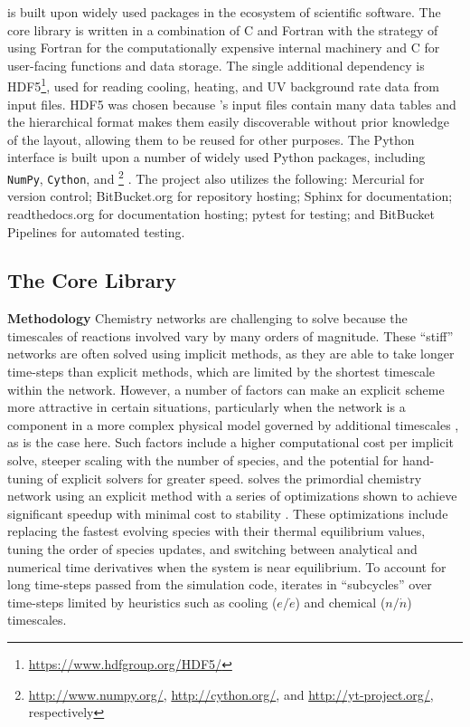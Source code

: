 \grackle{} is built upon widely used packages in the ecosystem of
scientific software.
The core
library is written in a combination of C and Fortran with the strategy
of using Fortran for the computationally expensive internal machinery
and C for user-facing functions and data storage.  The single
additional dependency is
HDF5\footnote{\url{https://www.hdfgroup.org/HDF5/}}, used for reading
cooling, heating,
and UV background rate data from input files.  HDF5 was chosen because
\grackle{}'s input files contain many data tables and the hierarchical
format makes them easily discoverable without prior knowledge of the
layout, allowing them to be reused for other purposes.  The Python
interface is built upon a number of widely used Python packages, including
\texttt{NumPy}, \texttt{Cython}, and
\yt{}\footnote{\url{http://www.numpy.org/}, \url{http://cython.org/},
  and \url{http://yt-project.org/}, respectively} \citep[][an SI2-funded
project]{2011ApJS..192....9T}.  The project also utilizes the following:
Mercurial for version control; BitBucket.org for repository hosting;
Sphinx for documentation; readthedocs.org for documentation
hosting; pytest for testing; and BitBucket Pipelines for automated testing.

\subsection{The Core Library}
\label{sec:core-library}

\noindent
{\bf Methodology}
Chemistry networks are challenging to solve because the timescales of
reactions involved vary by many orders of magnitude.  These ``stiff''
networks are often solved using implicit methods, as they are able to
take longer time-steps than explicit methods, which are limited by the
shortest timescale within the network.  However, a number of factors
can make an explicit scheme more attractive in certain situations,
particularly when the network is a component in a more complex physical
model governed by additional timescales \citep{2012JCoPh.231.5266G},
as is the case here.  Such factors include a higher
computational cost per implicit solve, steeper scaling
with the number of species, and the potential for hand-tuning of
explicit solvers for greater speed.  \grackle{} solves the primordial
chemistry network using an explicit method with a series of
optimizations shown to achieve
significant speedup with minimal cost to stability \citep{1997NewA....2..181A}.  These
optimizations include replacing the fastest evolving species with
their thermal equilibrium values, tuning the order of species updates,
and switching between analytical and numerical time derivatives when
the system is near equilibrium. To account for long time-steps passed
from the simulation code, \grackle{} iterates in ``subcycles'' over
time-steps limited by heuristics such as cooling ($e/\dot{e}$) and chemical
($n/\dot{n}$) timescales.

